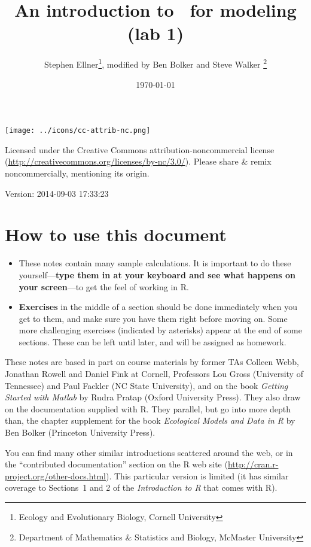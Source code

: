 \documentclass[11pt]{article}\usepackage[]{graphicx}\usepackage[]{color}
\title{An introduction to \R\ for modeling (lab 1)}
\date{\today}
\author{Stephen Ellner\thanks{Ecology and Evolutionary Biology,
    Cornell University}, modified by Ben Bolker and Steve Walker
  \thanks{Department of Mathematics \& Statistics and Biology,
    McMaster University}}
\newcommand\R{{\sf R}}
\newcounter{exercise}
\numberwithin{exercise}{section}
\begin{document}
\maketitle

\texttt{[image: ../icons/cc-attrib-nc.png]}

\begin{minipage}[b]{3in}
{\small Licensed under the Creative Commons 
  attribution-noncommercial license
(\url{http://creativecommons.org/licenses/by-nc/3.0/}).
Please share \& remix noncommercially,
mentioning its origin.}
\end{minipage}

Version: 2014-09-03 17:33:23
  
\addtocounter{section}{-1}
\section{How to use this document}





\begin{itemize}
\item These notes contain many sample calculations. It is important to 
do these yourself---\textbf{type them in at your keyboard and see what
happens on your screen}---to get the 
feel of working in \R. 
\item \textbf{Exercises} in the middle of a section should be done
immediately when you get to them, and make sure you have them right 
before moving on. Some more challenging exercises 
(indicated by asterisks) appear at the end of some sections. These
can be left until later, and will be assigned as homework.   
\end{itemize}

These notes are based in part on course materials by former TAs
Colleen Webb, Jonathan Rowell and Daniel Fink at Cornell, Professors
Lou Gross (University of Tennessee) and Paul Fackler (NC State
University), and on the book \emph{Getting Started with Matlab} by
Rudra Pratap (Oxford University Press).  They also draw on the
documentation supplied with \R.  They parallel, but go into 
more depth than, the chapter supplement for the book
\emph{Ecological Models and Data in \R} by Ben Bolker (Princeton University Press).

You can find many other similar introductions scattered around the
web, or in the ``contributed documentation'' section on the R web site
(\url{http://cran.r-project.org/other-docs.html}).  This particular
version is limited (it has similar coverage to Sections~1 and 2 of the
\emph{Introduction to \R} that comes with \R).
\end{document}
